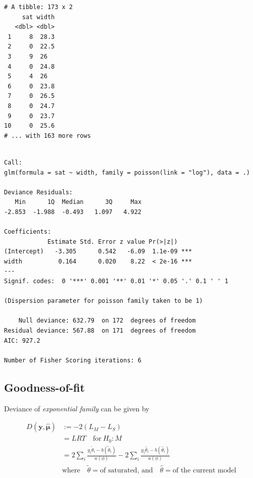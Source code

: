 \documentclass[]{book}
\newenvironment{Shaded}{\begin{snugshade}}{\end{snugshade}}
\newcommand{\DataTypeTok}[1]{\textcolor[rgb]{0.13,0.29,0.53}{#1}}
\newcommand{\KeywordTok}[1]{\textcolor[rgb]{0.13,0.29,0.53}{\textbf{#1}}}
\newcommand{\NormalTok}[1]{#1}
\newcommand{\OperatorTok}[1]{\textcolor[rgb]{0.81,0.36,0.00}{\textbf{#1}}}
\newcommand{\StringTok}[1]{\textcolor[rgb]{0.31,0.60,0.02}{#1}}
\begin{document}
\begin{verbatim}
# A tibble: 173 x 2
     sat width
   <dbl> <dbl>
 1     8  28.3
 2     0  22.5
 3     9  26  
 4     0  24.8
 5     4  26  
 6     0  23.8
 7     0  26.5
 8     0  24.7
 9     0  23.7
10     0  25.6
# ... with 163 more rows
\end{verbatim}

\begin{Shaded}
\end{Shaded}

\begin{verbatim}

Call:
glm(formula = sat ~ width, family = poisson(link = "log"), data = .)

Deviance Residuals: 
   Min      1Q  Median      3Q     Max  
-2.853  -1.988  -0.493   1.097   4.922  

Coefficients:
            Estimate Std. Error z value Pr(>|z|)    
(Intercept)   -3.305      0.542   -6.09  1.1e-09 ***
width          0.164      0.020    8.22  < 2e-16 ***
---
Signif. codes:  0 '***' 0.001 '**' 0.01 '*' 0.05 '.' 0.1 ' ' 1

(Dispersion parameter for poisson family taken to be 1)

    Null deviance: 632.79  on 172  degrees of freedom
Residual deviance: 567.88  on 171  degrees of freedom
AIC: 927.2

Number of Fisher Scoring iterations: 6
\end{verbatim}

\hypertarget{goodness-of-fit}{%
\subsection{Goodness-of-fit}\label{goodness-of-fit}}

Deviance of \emph{exponential family} can be given by

\begin{equation}
\begin{split}
D(\mathbf{y}, \boldsymbol{\hat\mu}) & := -2(L_M - L_S) \\
& = LRT \quad\text{for}\: H_0: M \\
& = 2\sum_i\frac{y_i\tilde\theta_i - b(\tilde\theta_i)}{a(\phi)} - 2\sum_i\frac{y_i\hat\theta_i - b(\hat\theta_i)}{a(\phi)} \\
& \text{where}\quad \tilde\theta = \text{of saturated, and} \quad \hat\theta = \text{of the current model}
\end{split}
\end{equation}
\end{document}
